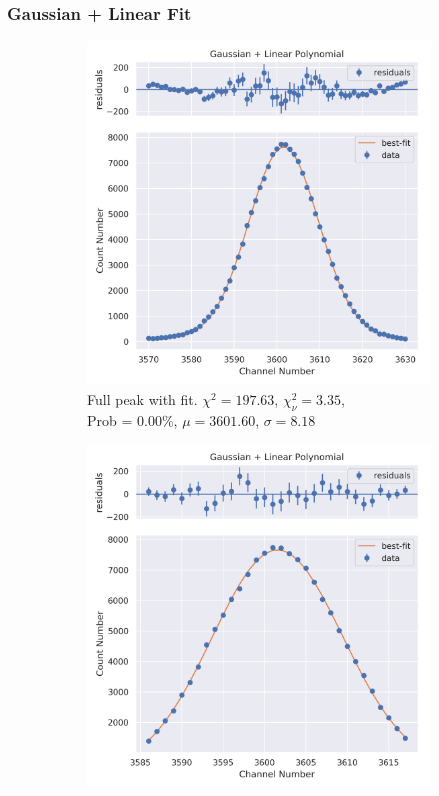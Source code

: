 \documentclass[11pt,a4paper]{article}
\begin{document}
\subsubsection{Gaussian + Linear Fit}
\begin{figure}[H]
  \centering
  \begin{subfigure}{.5\linewidth}
    \centering
    \includegraphics[width=\linewidth]{./Images/Sodium22/Linear/Linear_1_Full.png}
    \caption{Full peak with fit. $\chi^2 = 197.63$, $\chi^2_\nu = 3.35$, \\ Prob = 0.00\%, $\mu = 3601.60$, $\sigma = 8.18$}
  \end{subfigure}%
  \begin{subfigure}{.5\linewidth}
    \centering
    \includegraphics[width=\linewidth]{./Images/Sodium22/Linear/Linear_1_Zoom.png}

\end{subfigure}
\end{figure}
\end{document}
